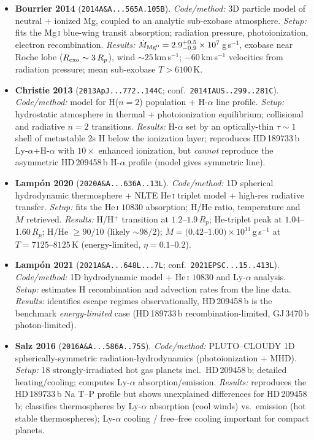 \begin{itemize}
\item \textbf{Bourrier 2014} (\texttt{2014A\&A...565A.105B}).
\emph{Code/method:} 3D particle model of neutral + ionized Mg, coupled to an analytic sub-exobase atmosphere.
\emph{Setup:} fits the Mg\,\textsc{i} blue-wing transit absorption; radiation pressure, photoionization, electron recombination.
\emph{Results:} $\dot M_{\rm Mg^0}=2.9^{+0.5}_{-0.9}\times10^{7}$\,g\,s$^{-1}$, exobase near Roche lobe ($R_{\rm exo}\sim3\,R_p$), wind $\sim25$\,km\,s$^{-1}$; $-60$\,km\,s$^{-1}$ velocities from radiation pressure; mean sub-exobase $T>6100$\,K.

\item \textbf{Christie 2013} (\texttt{2013ApJ...772..144C}; conf.\ \texttt{2014IAUS..299..281C}).
\emph{Code/method:} model for H($n=2$) population + H-$\alpha$ line profile.
\emph{Setup:} hydrostatic atmosphere in thermal + photoionization equilibrium; collisional and radiative $n=2$ transitions.
\emph{Results:} H-$\alpha$ set by an optically-thin $\tau\sim1$ shell of metastable 2s H below the ionization layer; reproduces HD\,189733\,b Ly-$\alpha$+H-$\alpha$ with $10\times$ enhanced ionization, but \emph{cannot} reproduce the asymmetric HD\,209458\,b H-$\alpha$ profile (model gives symmetric line).

\item \textbf{Lamp\'on 2020} (\texttt{2020A\&A...636A..13L}).
\emph{Code/method:} 1D spherical hydrodynamic thermosphere + NLTE He\,\textsc{i} triplet model + high-res radiative transfer.
\emph{Setup:} fits the He\,\textsc{i} $10830$ absorption; H/He ratio, temperature and $\dot M$ retrieved.
\emph{Results:} H/H$^+$ transition at $1.2$--$1.9\,R_p$; He-triplet peak at $1.04$--$1.60\,R_p$; H/He $\geq90/10$ (likely $\sim98/2$); $\dot M=(0.42$--$1.00)\times10^{11}$\,g\,s$^{-1}$ at $T=7125$--$8125$\,K (energy-limited, $\eta=0.1$--$0.2$).

\item \textbf{Lamp\'on 2021} (\texttt{2021A\&A...648L...7L}; conf.\ \texttt{2021EPSC...15..413L}).
\emph{Code/method:} 1D hydrodynamic model + He\,\textsc{i} $10830$ and Ly-$\alpha$ analysis.
\emph{Setup:} estimates H recombination and advection rates from the line data.
\emph{Results:} identifies escape regimes observationally, HD\,209458\,b is the benchmark \emph{energy-limited} case (HD\,189733\,b recombination-limited, GJ\,3470\,b photon-limited).

\item \textbf{Salz 2016} (\texttt{2016A\&A...586A..75S}).
\emph{Code/method:} PLUTO--CLOUDY 1D spherically-symmetric radiation-hydrodynamics (photoionization + MHD).
\emph{Setup:} 18 strongly-irradiated hot gas planets incl.\ HD\,209458\,b; detailed heating/cooling; computes Ly-$\alpha$ absorption/emission.
\emph{Results:} reproduces the HD\,189733\,b Na T--P profile but shows unexplained differences for HD\,209458\,b; classifies thermospheres by Ly-$\alpha$ absorption (cool winds) vs.\ emission (hot stable thermospheres); Ly-$\alpha$ cooling / free--free cooling important for compact planets.


\end{itemize}
